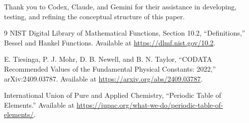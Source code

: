 \documentclass[11pt,a4paper]{article}
\begin{document}
Thank you to Codex, Claude, and Gemini for their assistance in developing, testing, and refining the conceptual structure of this paper.

\begin{thebibliography}{9}
NIST Digital Library of Mathematical Functions, Section 10.2, ``Definitions,'' Bessel and Hankel Functions. Available at \url{https://dlmf.nist.gov/10.2}.

E. Tiesinga, P. J. Mohr, D. B. Newell, and B. N. Taylor, ``CODATA Recommended Values of the Fundamental Physical Constants: 2022,'' arXiv:2409.03787. Available at \url{https://arxiv.org/abs/2409.03787}.

International Union of Pure and Applied Chemistry, ``Periodic Table of Elements.'' Available at \url{https://iupac.org/what-we-do/periodic-table-of-elements/}.
\end{thebibliography}
\end{document}
